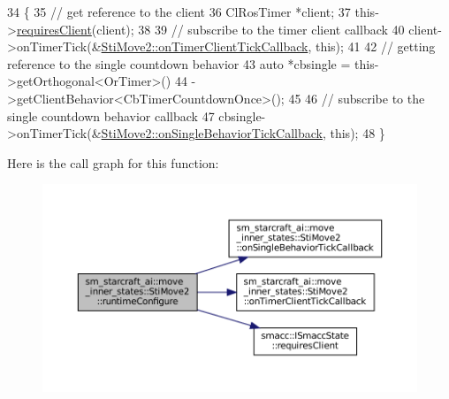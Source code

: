 \begin{DoxyCode}
34   \{
35     \textcolor{comment}{// get reference to the client}
36     ClRosTimer *client;
37     this->\hyperlink{classsmacc_1_1ISmaccState_a7f95c9f0a6ea2d6f18d1aec0519de4ac}{requiresClient}(client);
38 
39     \textcolor{comment}{// subscribe to the timer client callback}
40     client->onTimerTick(&\hyperlink{structsm__starcraft__ai_1_1move__inner__states_1_1StiMove2_a1a2c7056ff3fe7a55f1d9a08a29b374f}{StiMove2::onTimerClientTickCallback}, \textcolor{keyword}{this});
41 
42     \textcolor{comment}{// getting reference to the single countdown behavior}
43     \textcolor{keyword}{auto} *cbsingle = this->getOrthogonal<OrTimer>()
44                          ->getClientBehavior<CbTimerCountdownOnce>();
45 
46     \textcolor{comment}{// subscribe to the single countdown behavior callback}
47     cbsingle->onTimerTick(&\hyperlink{structsm__starcraft__ai_1_1move__inner__states_1_1StiMove2_adaca8083c53db1b32438d1df4575d3f7}{StiMove2::onSingleBehaviorTickCallback}, \textcolor{keyword}{
      this});
48   \}
\end{DoxyCode}
Here is the call graph for this function\+:
\nopagebreak
\begin{figure}[H]
\begin{center}
\leavevmode
\includegraphics[width=350pt]{structsm__starcraft__ai_1_1move__inner__states_1_1StiMove2_ab3b82e554437f2d8140a55da2d23ea51_cgraph}
\end{center}
\end{figure}
\mbox{\label{structsm__starcraft__ai_1_1move__inner__states_1_1StiMove2_a5d2748899e99bf46ee3135d41ac1a33f}} 
